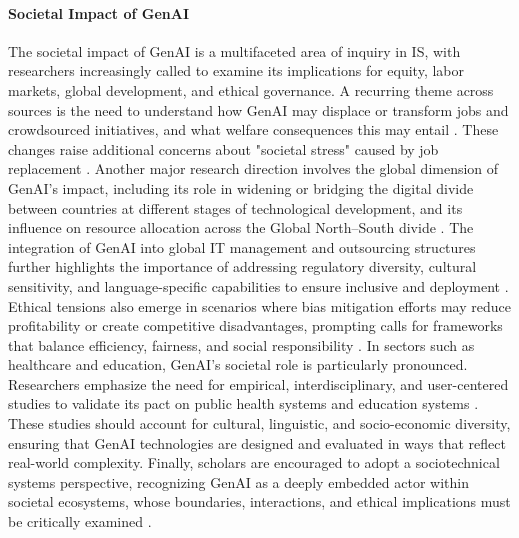 \paragraph{Societal Impact of GenAI}
The societal impact of GenAI is a multifaceted area of inquiry in IS, with researchers increasingly called to examine its implications for equity, labor markets, global development, and ethical governance. A recurring theme across sources is the need to understand how GenAI may displace or transform jobs and crowdsourced initiatives, and what welfare consequences this may entail \parencite{R04, R05, R10}. These changes raise additional concerns about "societal stress" caused by job replacement \parencite{R10}.
Another major research direction involves the global dimension of GenAI’s impact, including its role in widening or bridging the digital divide between countries at different stages of technological development, and its influence on resource allocation across the Global North–South divide \parencite{R07}. The integration of GenAI into global IT management and outsourcing structures further highlights the importance of addressing regulatory diversity, cultural sensitivity, and language-specific capabilities to ensure inclusive and deployment \parencite{R03}. Ethical tensions also emerge in scenarios where bias mitigation efforts may reduce profitability or create competitive disadvantages, prompting calls for frameworks that balance efficiency, fairness, and social responsibility \parencite{R01, S18}.
In sectors such as healthcare and education, GenAI’s societal role is particularly pronounced. Researchers emphasize the need for empirical, interdisciplinary, and user-centered studies to validate its pact on public health systems and education systems \parencite{S01, S11, S17}. These studies should account for cultural, linguistic, and socio-economic diversity, ensuring that GenAI technologies are designed and evaluated in ways that reflect real-world complexity. Finally, scholars are encouraged to adopt a sociotechnical systems perspective, recognizing GenAI as a deeply embedded actor within societal ecosystems, whose boundaries, interactions, and ethical implications must be critically examined \parencite{R09, R10}.


